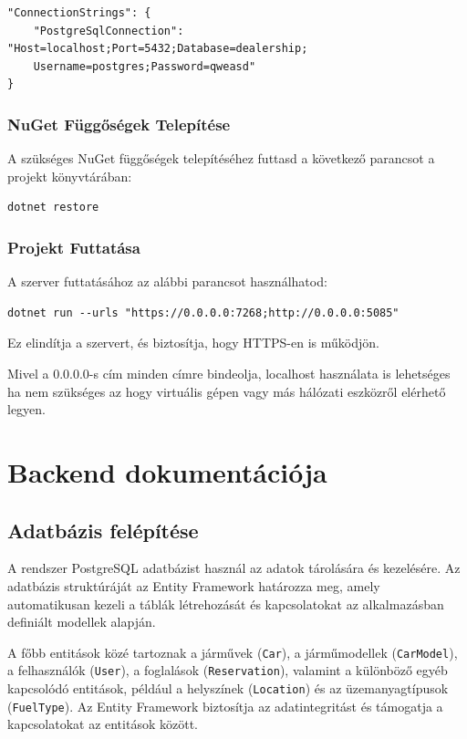\documentclass{report}[11pt]
\begin{document}
\begin{verbatim}
"ConnectionStrings": {
    "PostgreSqlConnection": "Host=localhost;Port=5432;Database=dealership;
    Username=postgres;Password=qweasd"
}
\end{verbatim}

\subsection{NuGet Függőségek Telepítése}
A szükséges NuGet függőségek telepítéséhez futtasd a következő parancsot a projekt könyvtárában:

\begin{verbatim}
dotnet restore
\end{verbatim}

\subsection{Projekt Futtatása}
A szerver futtatásához az alábbi parancsot használhatod:

\begin{verbatim}
dotnet run --urls "https://0.0.0.0:7268;http://0.0.0.0:5085"
\end{verbatim}

Ez elindítja a szervert, és biztosítja, hogy HTTPS-en is működjön.

Mivel a 0.0.0.0-s cím minden címre bindeolja, localhost használata is lehetséges ha nem szükséges az hogy virtuális gépen vagy más hálózati eszközről elérhető legyen.

\chapter{Backend dokumentációja}
\section{Adatbázis felépítése}


A rendszer PostgreSQL adatbázist használ az adatok tárolására és kezelésére. Az adatbázis struktúráját az Entity Framework határozza meg, amely automatikusan kezeli a táblák létrehozását és kapcsolatokat az alkalmazásban definiált modellek alapján.  

A főbb entitások közé tartoznak a járművek (\texttt{Car}), a járműmodellek (\texttt{CarModel}),  a felhasználók (\texttt{User}), a foglalások (\texttt{Reservation}), valamint a különböző egyéb kapcsolódó entitások, például a helyszínek (\texttt{Location}) és az üzemanyagtípusok (\texttt{FuelType}). Az Entity Framework biztosítja az adatintegritást és támogatja a kapcsolatokat az entitások között.  
\end{document}
